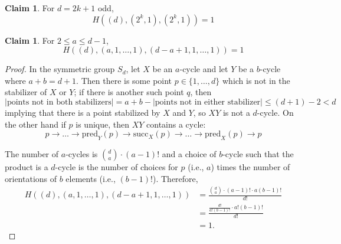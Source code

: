 \documentclass[11pt]{article}           %
\theoremstyle{definition}
\newtheorem{claim}[thm]{Claim}
\begin{document}
\begin{claim}
  \label{claim:twosodd}
For $d=2k+1$ odd,
\[
H((d),(2^k,1),(2^{k},1))=1
\]
\end{claim}

\begin{claim}
For $2\leq a\leq d-1$,
\[
H((d),(a,1,\dots,1),(d-a+1,1,\dots,1))=1
\]
\end{claim}
\begin{proof}
  In the symmetric group $S_d$, let $X$ be an $a$-cycle and let
  $Y$ be a $b$-cycle where $a+b=d+1$. Then there is some point
  $p\in\{1,\dots,d\}$ which is not in the stabilizer of $X$ or $Y$;
  if there is another such point $q$, then
  \[
  |\text{points not in both stabilizers}|=a+b-|\text{points not in either stabilizer}|\leq (d+1)-2<d
  \]
  implying that there is a point stabilized by $X$ and $Y$, so $XY$ is not a $d$-cycle. On the other hand
  if $p$ is unique, then
  $XY$ contains a cycle:
  \[
  p\to\dots\to \text{pred}_Y(p)\to\text{succ}_X(p)\to\dots\to\text{pred}_X(p)\to p
  \]
  
  The number of $a$-cycles is $\binom da\cdot (a-1)!$
  and a choice of $b$-cycle such that the product is a $d$-cycle is
  the number of choices for $p$ (i.e., $a$) times the number of orientations
  of $b$ elements (i.e., $(b-1)!$). Therefore,
  \begin{align*}
    H((d),(a,1,\dots,1),(d-a+1,1,\dots,1))&=\frac{\binom da\cdot (a-1)!\cdot a(b-1)!}{d!} \\
    &=\frac{\frac{d!}{a!(b-1)!}\cdot a!(b-1)!}{d!} \\
    &=1.
  \end{align*}
  \end{proof}
\end{document}
